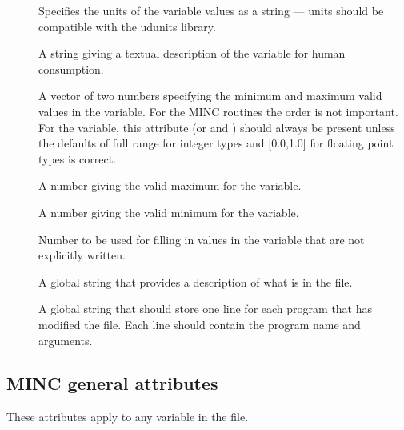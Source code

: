 \documentclass{article}
\begin{document}
\begin{description}
   \item [] Specifies the units of the variable values
      as a string --- units should be compatible with the udunits
      library.
   \item [] A string giving a textual description of
      the variable for human consumption.
   \item [] A vector of two numbers specifying the
      minimum and maximum valid values in the variable. For the MINC
      routines the order is not important. For the 
      variable, this attribute (or  and
      ) should always be present unless the
      defaults of full range for integer types and [0.0,1.0] for floating
      point types is correct.
   \item [] A number giving the valid maximum for
      the variable.
   \item [] A number giving the valid minimum for
      the variable.
   \item [] Number to be used for filling in values in
      the variable that are not explicitly written.
   \item [] A global string that provides a description
      of what is in the file.
   \item [] A global string that should store one line
      for each program that has modified the file. Each line should
      contain the program name and arguments.
\end{description}

\subsection{MINC general attributes}

These attributes apply to any variable in the file. 
\end{document}
